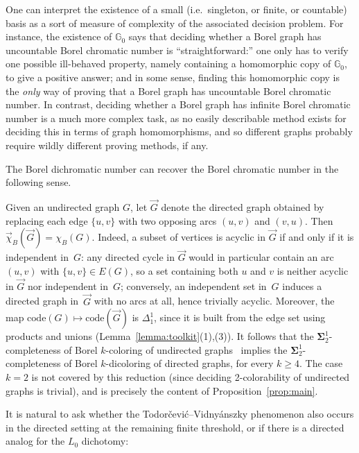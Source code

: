 \documentclass[12pt]{article}
\begin{document}
One can interpret the existence of a small (i.e.\ singleton, or finite, or countable) basis as a sort of measure of complexity of the associated decision problem.
For instance, the existence of $\mathbb{G}_0$ says that deciding whether a Borel graph has uncountable Borel chromatic number is ``straightforward:'' one only has to verify one possible ill-behaved property, namely containing a homomorphic copy of $\mathbb{G}_0$, to give a positive answer; and in some sense, finding this homomorphic copy is the \emph{only} way of proving that a Borel graph has uncountable Borel chromatic number.
In contrast, deciding whether a Borel graph has infinite Borel chromatic number is a much more complex task, as no easily describable method exists for deciding this in terms of graph homomorphisms, and so different graphs probably require wildly different proving methods, if any.

The Borel dichromatic number can recover the Borel chromatic number in the following sense.

\begin{remark}\label{rmk:dichrom-recovers-chrom}
	Given an undirected graph $G$, let $\vec{G}$ denote the directed graph obtained by replacing each edge $\{u,v\}$ with two opposing arcs $(u,v)$ and $(v,u)$.
	Then $\vec\chi_B(\vec{G}) = \chi_B(G)$.
	Indeed, a subset of vertices is acyclic in $\vec{G}$ if and only if it is independent in~$G$: any directed cycle in $\vec{G}$ would in particular contain an arc $(u,v)$ with $\{u,v\}\in E(G)$, so a set containing both $u$ and $v$ is neither acyclic in $\vec{G}$ nor independent in~$G$; conversely, an independent set in~$G$ induces a directed graph in~$\vec{G}$ with no arcs at all, hence trivially acyclic.
	Moreover, the map $\mathrm{code}(G)\mapsto\mathrm{code}(\vec{G})$ is $\Delta^1_1$, since it is built from the edge set using products and unions (Lemma~\ref{lemma:toolkit}(1),(3)).
	It follows that the $\mathbf\Sigma^1_2$-completeness of Borel $k$-coloring of undirected graphs~\cite{Todorcevic_2021_ComplexProbBorel} implies the $\mathbf\Sigma^1_2$-completeness of Borel $k$-dicoloring of directed graphs, for every $k\geq 4$.
	The case $k=2$ is not covered by this reduction (since deciding 2-colorability of undirected graphs is trivial), and is precisely the content of Proposition~\ref{prop:main}.
\end{remark}

It is natural to ask whether the Todorčević--Vidnyánszky phenomenon also occurs in the directed setting at the remaining finite threshold, or if there is a directed analog for the $L_0$ dichotomy:
\end{document}
